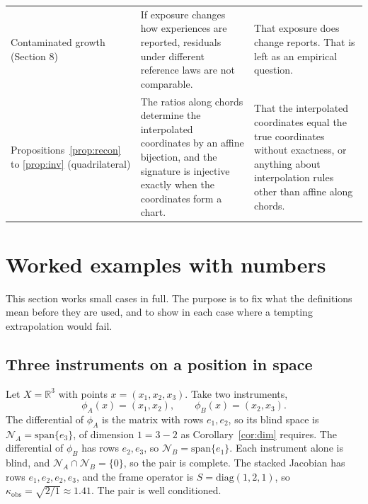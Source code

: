 \documentclass[11pt]{article}
\theoremstyle{remark}
\newcommand{\R}{\mathbb{R}}
\newcommand{\N}{\mathcal{N}}
\begin{document}
\begin{longtable}{@{}p{2.7cm}p{6.0cm}p{6.0cm}@{}}
Contaminated growth (Section 8) & If exposure changes how experiences are reported, residuals under different reference laws are not comparable. & That exposure does change reports. That is left as an empirical question.\\
Propositions~\ref{prop:recon} to \ref{prop:inv} (quadrilateral) & The ratios along chords determine the interpolated coordinates by an affine bijection, and the signature is injective exactly when the coordinates form a chart. & That the interpolated coordinates equal the true coordinates without exactness, or anything about interpolation rules other than affine along chords.\\
\hline
\end{longtable}

\section{Worked examples with numbers}\label{sec:examples}

This section works small cases in full. The purpose is to fix what the definitions mean before they are used, and to show in each case where a tempting extrapolation would fail.

\subsection{Three instruments on a position in space}

Let $X=\R^3$ with points $x=(x_1,x_2,x_3)$. Take two instruments,
\[
\phi_A(x)=(x_1,x_2),\qquad \phi_B(x)=(x_2,x_3).
\]
The differential of $\phi_A$ is the matrix with rows $e_1,e_2$, so its blind space is $\N_A=\mathrm{span}\{e_3\}$, of dimension $1=3-2$ as Corollary~\ref{cor:dim} requires. The differential of $\phi_B$ has rows $e_2,e_3$, so $\N_B=\mathrm{span}\{e_1\}$. Each instrument alone is blind, and $\N_A\cap\N_B=\{0\}$, so the pair is complete. The stacked Jacobian has rows $e_1,e_2,e_2,e_3$, and the frame operator is $S=\mathrm{diag}(1,2,1)$, so $\kappa_{\mathrm{obs}}=\sqrt{2/1}\approx1.41$. The pair is well conditioned.
\end{document}
